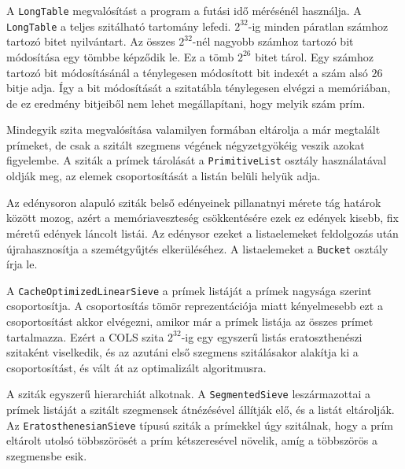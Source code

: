 A \texttt{LongTable} megvalósítást a program a futási idő mérésénél használja.
A \texttt{LongTable} a teljes szitálható tartomány lefedi.
$2^{32}$-ig minden páratlan számhoz tartozó bitet nyilvántart.
Az összes $2^{32}$-nél nagyobb számhoz tartozó bit módosítása egy tömbbe képződik le.
Ez a tömb $2^{26}$ bitet tárol.
Egy számhoz tartozó bit módosításánál a ténylegesen módosított bit indexét a szám alsó $26$ bitje adja.
Így a bit módosítását a szitatábla ténylegesen elvégzi a memóriában, de ez eredmény bitjeiből nem lehet megállapítani, hogy melyik szám prím.

Mindegyik szita megvalósítása valamilyen formában eltárolja a már megtalált prímeket, de csak a szitált szegmens végének négyzetgyökéig veszik azokat figyelembe.
A sziták a prímek tárolását a \texttt{PrimitiveList} osztály használatával oldják meg, az elemek csoportosítását a listán belüli helyük adja.

Az edénysoron alapuló sziták belső edényeinek pillanatnyi mérete tág határok között mozog, azért a memóriaveszteség csökkentésére ezek ez edények kisebb, fix méretű edények láncolt listái.
Az edénysor ezeket a listaelemeket feldolgozás után újrahasznosítja a szemétgyűjtés elkerüléséhez.
A listaelemeket a \texttt{Bucket} osztály írja le.

A \texttt{CacheOptimizedLinearSieve} a prímek listáját a prímek nagysága szerint csoportosítja.
A csoportosítás tömör reprezentációja miatt kényelmesebb ezt a csoportosítást akkor elvégezni, amikor már a prímek listája az összes prímet tartalmazza.
Ezért a COLS szita $2^{32}$-ig egy egyszerű listás eratoszthenészi szitaként viselkedik, és az azutáni első szegmens szitálásakor alakítja ki a csoportosítást, és vált át az optimalizált algoritmusra.

A sziták egyszerű hierarchiát alkotnak.
A \texttt{SegmentedSieve} leszármazottai a prímek listáját a szitált szegmensek átnézésével állítják elő, és a listát eltárolják.
Az \texttt{EratosthenesianSieve} típusú sziták a prímekkel úgy szitálnak, hogy a prím eltárolt utolsó többszörösét a prím kétszeresével növelik, amíg a többszörös a szegmensbe esik.

